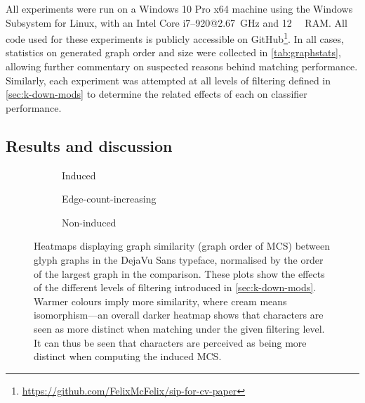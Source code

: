 \documentclass{mpaper}
\begin{document}
\noindent
All experiments were run on a Windows 10 Pro x64 machine using the Windows Subsystem for Linux, with an Intel Core i7--920@\SI{2.67}{\GHz} and \SI{12}{\gibi\byte} RAM.
All code used for these experiments is publicly accessible on GitHub\footnote{\url{https://github.com/FelixMcFelix/sip-for-cv-paper}}.
In all cases, statistics on generated graph order and size were collected in \cref{tab:graphstats}, allowing further commentary on suspected reasons behind matching performance.
Similarly, each experiment was attempted at all levels of filtering defined in \cref{sec:k-down-mods} to determine the related effects of each on classifier performance.



\subsection{Results and discussion}


\begin{figure}
	\centering
	\begin{subfigure}[b]{0.3\linewidth}
		
		\caption{
			Induced
			\label{fig:heat:filter:induced}
		}
	\end{subfigure}
	\begin{subfigure}[b]{0.3\linewidth}
		
		\caption{
			Edge-count-increasing
			\label{fig:heat:filter:eci}
		}
	\end{subfigure}
	\begin{subfigure}[b]{0.3\linewidth}
		
		\caption{
			Non-induced
			\label{fig:heat:filter:non-ind}
		}
	\end{subfigure}

\vspace{0.5em}
\caption{
	Heatmaps displaying graph similarity (graph order of MCS) between glyph graphs in the DejaVu Sans typeface, normalised by the order of the largest graph in the comparison.
	These plots show the effects of the different levels of filtering introduced in \cref{sec:k-down-mods}.
	Warmer colours imply more similarity, where cream means isomorphism---an overall darker heatmap shows that characters are seen as more distinct when matching under the given filtering level.	
	It can thus be seen that characters are perceived as being more distinct when computing the  induced MCS.
	\label{fig:heat:filter}
}
\end{figure}
\end{document}
